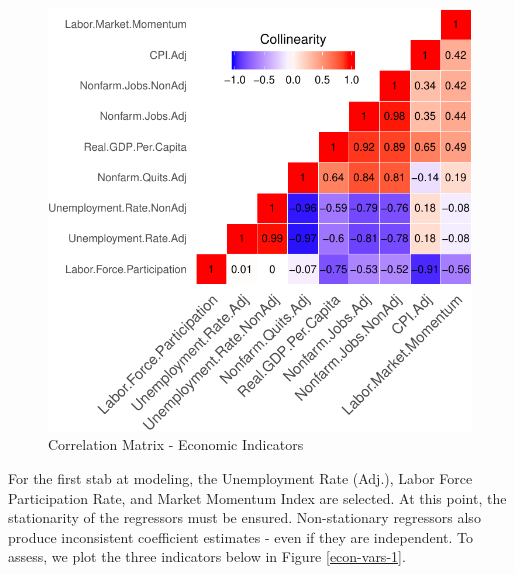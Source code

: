 \documentclass[12pt,letterpaper,toc=flat,oneside]{report}
\theoremstyle{definition}
\theoremstyle{definition}
\theoremstyle{definition}
\theoremstyle{remark}
\begin{document}
\begin{figure}[H]

{\centering \includegraphics{elliott-econometric-personnel-retention-18_files/figure-latex/heat-map-1-1} 

}

\caption{Correlation Matrix - Economic Indicators}\label{fig:heat-map-1}
\end{figure}

For the first stab at modeling, the Unemployment Rate (Adj.), Labor
Force Participation Rate, and Market Momentum Index are selected. At
this point, the stationarity of the regressors must be ensured.
Non-stationary regressors also produce inconsistent coefficient
estimates - even if they are independent. To assess, we plot the three
indicators below in Figure \ref{econ-vars-1}.
\end{document}
